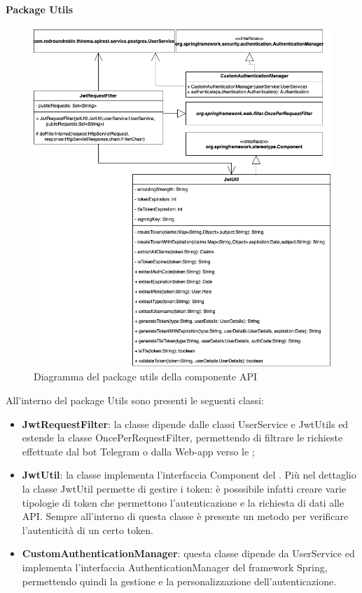 		\paragraph*{Package Utils}
		\newpage
		\begin{figure}[H]
			\centering
			\includegraphics[scale=0.550]{res/images/API/UtilsPackage.png}
			\caption{Diagramma del package utils della componente API}
			\label{Diagramma 11}
		\end{figure}
		\newpage
		All'interno del package Utils sono presenti le seguenti classi:
		\begin{itemize}
			\item \textbf{JwtRequestFilter}: la classe dipende dalle classi UserService e JwtUtils ed estende la classe OncePerRequestFilter, permettendo di filtrare le richieste effettuate dal bot Telegram o dalla Web-app verso le ;
			\item \textbf{JwtUtil}: la classe implementa l'interfaccia Component del . Più nel dettaglio la classe JwtUtil permette di gestire i token: è posssibile infatti creare varie tipologie di token che permettono l'autenticazione e la richiesta di dati alle API. Sempre all'interno di questa classe è presente un metodo per verificare l'autenticità di un certo token.
			\item \textbf{CustomAuthenticationManager}: questa classe dipende da UserService ed implementa l'interfaccia AuthenticationManager del framework Spring, permettendo quindi la gestione e la personalizzazione dell'autenticazione.
		\end{itemize}
